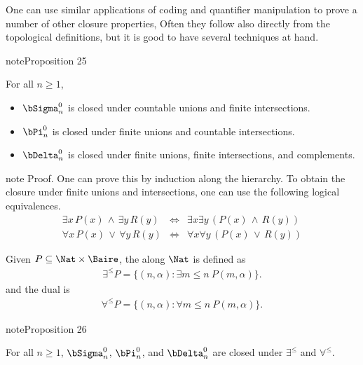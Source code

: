 \documentclass[letterpaper,10pt,english]{jupyterBook}
\begin{document}
\sphinxAtStartPar
One can use similar applications of coding and quantifier manipulation to prove a number of other closure properties, Often they follow also directly from the topological definitions, but it is good to have several techniques at hand.
\label{structureBorel:prop-Borel-closure-finite}
\begin{sphinxadmonition}{note}{Proposition 25}



\sphinxAtStartPar
For all \(n \geq 1\),
\begin{itemize}
\item {} 
\sphinxAtStartPar
{}  \(\bSigma^0_n\) is closed under countable unions and finite intersections.

\item {} 
\sphinxAtStartPar
{} \(\bPi^0_n\) is closed under finite unions and countable intersections.

\item {} 
\sphinxAtStartPar
{} \(\bDelta^0_n\) is closed under finite unions, finite intersections, and complements.

\end{itemize}
\end{sphinxadmonition}

\begin{sphinxadmonition}{note}
\sphinxAtStartPar
Proof. One can prove this by induction along the hierarchy. To obtain the closure under finite unions and intersections, one can use the following logical equivalences.
\begin{eqnarray*}
    \exists x \, P(x) \, \wedge \,  \exists y \, R(y) &\iff& \exists x  \exists y \, (P(x) \, \wedge \,  R(y)) \\
    \forall x \, P(x) \, \vee \,  \forall y \, R(y) &\iff& \forall x  \forall y \, (P(x) \, \vee \,  R(y))
\end{eqnarray*}\end{sphinxadmonition}

\sphinxAtStartPar
Given \(P \subseteq \Nat \times \Baire\), the  along \(\Nat\)
is defined as
\begin{equation*}
\begin{split}
	\exists^\leq P = \{ (n,\alpha) \colon \exists m \leq n \: P(m,\alpha)\}.
\end{split}
\end{equation*}
\sphinxAtStartPar
and the dual is
\begin{equation*}
\begin{split}
	\forall^\leq P = \{ (n,\alpha) \colon \forall m \leq n \: P(m,\alpha)\}.
\end{split}
\end{equation*}\label{structureBorel:prop-Borel-closure-bounded-projection}
\begin{sphinxadmonition}{note}{Proposition 26}



\sphinxAtStartPar
For all \(n \geq 1\), \(\bSigma^0_n\), \(\bPi^0_n\), and \(\bDelta^0_n\) are closed under \(\exists^\leq\) and \(\forall^\leq\).
\end{sphinxadmonition}
\end{document}
